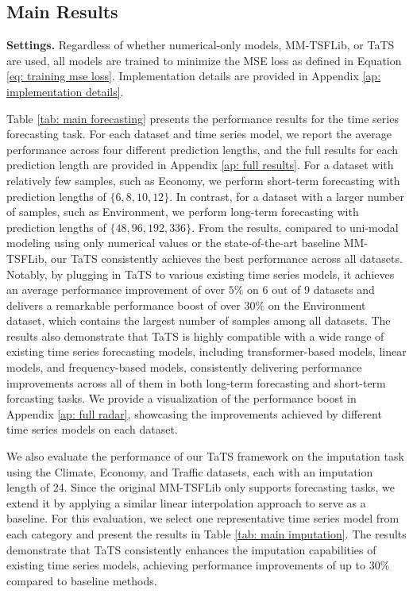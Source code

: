 \subsection{Main Results}

\textbf{Settings.} Regardless of whether numerical-only models, MM-TSFLib, or TaTS are used, all models are trained to minimize the MSE loss as defined in Equation \ref{eq: training mse loss}. Implementation details are provided in Appendix \ref{ap: implementation details}.

Table \ref{tab: main forecasting} presents the performance results for the time series forecasting task. For each dataset and time series model, we report the average performance across four different prediction lengths, and the full results for each prediction length are provided in Appendix \ref{ap: full results}. For a dataset with relatively few samples, such as Economy, we perform short-term forecasting with prediction lengths of $\{6, 8, 10, 12\}$. In contrast, for a dataset with a larger number of samples, such as Environment, we perform long-term forecasting with prediction lengths of $\{48, 96, 192, 336\}$. 
From the results, compared to uni-modal modeling using only numerical values or the state-of-the-art baseline MM-TSFLib, our TaTS consistently achieves the best performance across all datasets. Notably, by plugging in TaTS to various existing time series models, it achieves an average performance improvement of over $5\%$ on 6 out of 9 datasets and delivers a remarkable performance boost of over $30\%$ on the Environment dataset, which contains the largest number of samples among all datasets. The results also demonstrate that TaTS is highly compatible with a wide range of existing time series forecasting models, including transformer-based models, linear models, and frequency-based models, consistently delivering performance improvements across all of them in both long-term forecasting and short-term forcasting tasks. We provide a visualization of the performance boost in Appendix \ref{ap: full radar}, showcasing the improvements achieved by different time series models on each dataset.




We also evaluate the performance of our TaTS framework on the imputation task using the Climate, Economy, and Traffic datasets, each with an imputation length of 24. Since the original MM-TSFLib only supports forecasting tasks, we extend it by applying a similar linear interpolation approach to serve as a baseline. For this evaluation, we select one representative time series model from each category and present the results in Table \ref{tab: main imputation}. The results demonstrate that TaTS consistently enhances the imputation capabilities of existing time series models, achieving performance improvements of up to $30\%$ compared to baseline methods.

